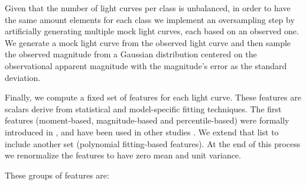 \documentclass[a4paper,fleqn,usenatbib]{mnras}
\begin{document}
Given that the number of light curves per class is unbalanced, 
in order to have the same amount elements for each class we implement an
oversampling step by artificially generating multiple mock light curves,
each based on an observed one. 
We generate a mock light curve from the observed light curve and 
then sample the observed magnitude from a Gaussian distribution
centered on the observational apparent magnitude with the magnitude's
error as the standard deviation. 


Finally, we compute a fixed set of features for each light curve. 
These features are scalars derive from statistical and model-specific
fitting techniques. 
The first features (moment-based, magnitude-based and
percentile-based) were formally introduced in 
\cite{1101.1959}, and have been used in other studies \citep{1603.00882,1601.03931}.  
We extend that list to include another set (polynomial fitting-based features). 
At the end of this process we renormalize the features to have zero
mean and unit variance.  

These groups of features are:
\end{document}
